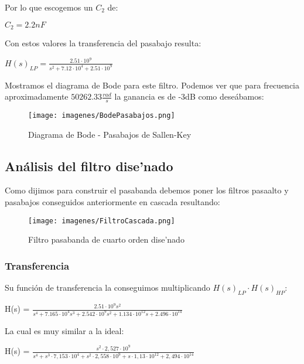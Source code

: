 \documentclass[12pt, titlepage]{article}
\begin{document}
    Por lo que escogemos un $C_2$ de:
    
    \begin{center}
        $C_2 = 2.2nF$
    \end{center}
     
     Con estos valores la transferencia del pasabajo resulta:
     
     \begin{center}
     $H(s)_{LP} = \frac{2.51\cdot10^9}{s^2+ 7.12\cdot10^4 + 2.51\cdot10^9}$    
     \end{center}
     
    Mostramos el diagrama de Bode para este filtro.
    Podemos ver que para frecuencia aproximadamente $50262.33\frac{rad}{s}$ la ganancia es de -3dB como deseábamos: 
     
    \begin{figure}[!htb]
    \texttt{[image: imagenes/BodePasabajos.png]}
    \centering
    \caption{Diagrama de Bode - Pasabajos de Sallen-Key}
    \end{figure}
  
  \newpage
  
    \subsection{Análisis del filtro dise'nado}
    Como dijimos para construir el pasabanda debemos poner los filtros pasaalto y pasabajos conseguidos anteriormente en cascada resultando:
    
     \begin{figure}[!htb]
    \texttt{[image: imagenes/FiltroCascada.png]}
    \centering
    \caption{Filtro pasabanda de cuarto orden dise'nado}
    \end{figure}
    
    \subsubsection{Transferencia}
    
    Su función de transferencia la conseguimos multiplicando $H(s)_{LP}\cdot H(s)_{HP}$:
    \begin{center}
          H(s) = $\frac{2.51 \cdot 10^9 s^2}{s^4 + 7.165 \cdot10^4 s^3 + 2.542 \cdot 10^9 s^2 + 1.134 \cdot 10^{12} s + 2.496 \cdot 10^{14}}$
    \end{center}
    
    La cual es muy similar a la ideal: 
   \begin{center}
       H(s) = $
    \frac{s^2 \cdot 2,527 \cdot 10^9}
    {s^4 + s^3 \cdot 7,153 \cdot 10^4 + 
     s^2 \cdot 2,558 \cdot 10^9  +
     s \cdot 1,13\cdot 10^{12} +
     2,494 \cdot 10^{14} }
$
   \end{center}
   
\end{document}
